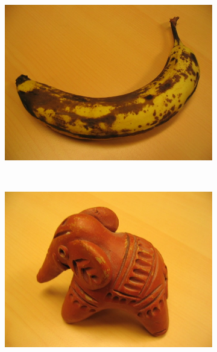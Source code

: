 \documentclass[10pt,twocolumn,letterpaper]{article}
\begin{document}
\begin{figure}[t]
\begin{subfigure}[b]{0.15\textwidth}
                \includegraphics[width=\textwidth]{figures/input/banana1.jpg}
        \end{subfigure}%
        ~
        \begin{subfigure}[b]{0.15\textwidth}
                \includegraphics[width=\textwidth]{figures/input/elefant.jpg}
        \end{subfigure}
        

\end{figure}
\end{document}
